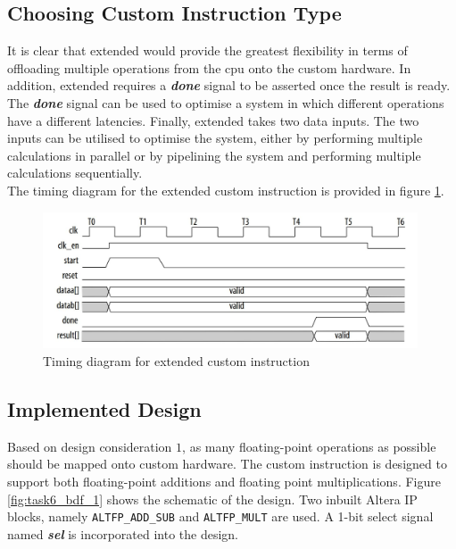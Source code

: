 \documentclass{article}
\begin{document}
\subsection{Choosing Custom Instruction Type}
It is clear that extended would provide the greatest flexibility in terms of offloading multiple operations from the cpu onto the custom hardware. In addition, extended requires a \textbf{\textit{done}} signal to be asserted once the result is ready. The \textbf{\textit{done}} signal can be used to optimise a system in which different operations have a different latencies. Finally, extended takes two data inputs. The two inputs can be utilised to optimise the system, either by performing multiple calculations in parallel or by pipelining the system and performing multiple calculations sequentially.\\
\newpage
The timing diagram for the extended custom instruction is provided in figure \ref{fig:extended_custom_timing}.

\begin{figure}[H]
    \centering
    \includegraphics[width=0.99\textwidth]{extended_custom_instruction}  
    \caption{Timing diagram for extended custom instruction}
    \label{fig:extended_custom_timing}
\end{figure}

\subsection{Implemented Design}\label{sec:implemented_design}
Based on design consideration $1$, as many floating-point operations as possible should be mapped onto custom hardware. The custom instruction is designed to support both floating-point additions and floating point multiplications. Figure \ref{fig:task6_bdf_1} shows the schematic of the design. Two inbuilt Altera IP blocks, namely {\tt ALTFP\_ADD\_SUB} and {\tt ALTFP\_MULT} are used. A 1-bit select signal named \textbf{\textit{sel}} is incorporated into the design. 
\end{document}
